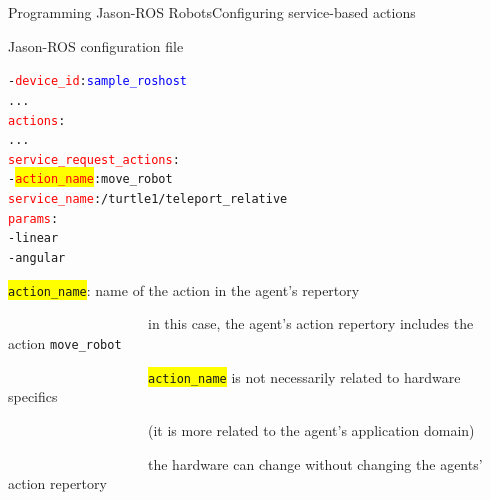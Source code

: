\documentclass[compress]{beamer}
\newcommand{\yamlkey}[1]{\textcolor{red}{\texttt{#1}}}
\newcommand{\yamlvalue}[1]{\textcolor{blue}{\texttt{#1}}}
\begin{document}
\begin{frame}[fragile]{Programming Jason-ROS Robots}{Configuring service-based actions}{}


\footnotesize

\begin{block}{Jason-ROS configuration file}


\scriptsize
\begin{alltt}\scriptsize
- \yamlkey{device_id}: \yamlvalue{sample_roshost}
     ...
  \yamlkey{actions}:        
        ...
     \yamlkey{service_request_actions}:
        - \colorbox{yellow}{\yamlkey{action_name}}: move_robot
          \yamlkey{service_name}: /turtle1/teleport_relative
          \yamlkey{params}:
             - linear
             - angular
\end{alltt}
    
\end{block}  

 \colorbox{yellow}{\texttt{action\_name}}: name of the action in the agent's repertory\\
 
  \vspace{-.5cm}
 

 
 \ \ \ \ \ \ \ \ \ \ \ \ \ \ \ \ \ \ \ \ {\tiny in this case, the agent's action repertory includes the action \texttt{move\_robot}}\\
 
 \vspace{-.5cm}
 
 \ \ \ \ \ \ \ \ \ \ \ \ \ \ \ \ \ \ \ \ {\tiny \colorbox{yellow}{\texttt{action\_name}} is not necessarily related to hardware specifics}\\
 
  \vspace{-.5cm}
 
 \ \ \ \ \ \ \ \ \ \ \ \ \ \ \ \ \ \ \ \ {\tiny (it is more related to the agent's application domain)}\\
 
  
  \vspace{-.5cm}
 
 \ \ \ \ \ \ \ \ \ \ \ \ \ \ \ \ \ \ \ \ {\tiny the hardware can change without changing the agents' action repertory}\\
 


\end{frame}
\end{document}
